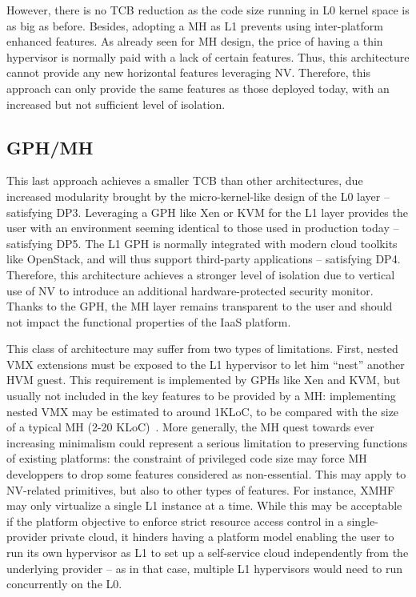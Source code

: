 \documentclass{sig-alternate}
\begin{document}
However, there is no TCB reduction as the code size running in L0 kernel space is as big as before. 
Besides, adopting a MH as L1 prevents using inter-platform enhanced features. As already seen for MH design, the price of having a thin hypervisor is normally paid with a lack of certain features. 
Thus, this architecture cannot provide any new horizontal features leveraging NV. Therefore, this approach can only provide the same features as those deployed today, with an increased but not sufficient level of isolation.

\subsection{GPH/MH}
\label{par:gom}

\noindent This last approach achieves a smaller TCB than other architectures, due increased modularity brought by the micro-kernel-like design of the L0 layer -- satisfying DP3. Leveraging a GPH like Xen or KVM for the L1 layer provides the user with an environment seeming identical to those used in production today -- satisfying DP5. The L1 GPH is normally integrated with modern cloud toolkits like OpenStack, and will thus support third-party applications -- satisfying DP4.
Therefore, this architecture achieves a stronger level of isolation due to vertical use of NV to introduce an additional hardware-protected security monitor. Thanks to the GPH, the MH layer remains transparent to the user and should not impact the functional properties of the IaaS platform.

This class of architecture may suffer from two types of limitations. First, nested VMX extensions must be exposed to the L1 hypervisor to let him ``nest'' another HVM guest. This requirement is implemented by GPHs like Xen and KVM, but usually not included in the key features to be provided by a MH: implementing nested VMX may be estimated to around 1KLoC, to be compared with the size of a typical MH (2-20 KLoC)~\cite{xmhf}.
More generally, the MH quest towards ever increasing minimalism could represent a serious limitation to preserving functions of existing platforms: the constraint of privileged code size may force MH developpers to drop some features considered as non-essential. This may apply to NV-related primitives, but also to other types of features. For instance, XMHF may only virtualize a single L1 instance at a time. While this may be acceptable if the platform objective to enforce strict resource access control in a single-provider private cloud, it hinders having a platform model enabling the user to run its own hypervisor as L1 to set up a self-service cloud independently from the underlying provider -- as in that case, multiple L1 hypervisors would need to run concurrently on the L0.
\end{document}
